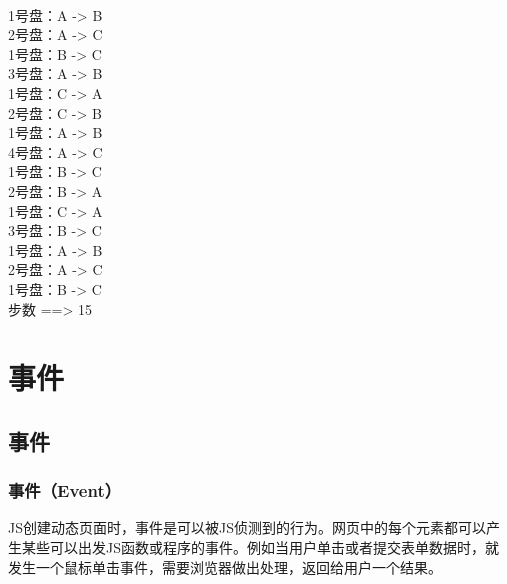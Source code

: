 \begin{tcolorbox}
	 \\
	1号盘：A -> B \\
	2号盘：A -> C \\
	1号盘：B -> C \\
	3号盘：A -> B \\
	1号盘：C -> A \\
	2号盘：C -> B \\
	1号盘：A -> B \\
	4号盘：A -> C \\
	1号盘：B -> C \\
	2号盘：B -> A \\
	1号盘：C -> A \\
	3号盘：B -> C \\
	1号盘：A -> B \\
	2号盘：A -> C \\
	1号盘：B -> C \\
	步数 ==> 15
\end{tcolorbox}

\newpage

\chapter{事件}

\section{事件}

\subsection{事件（Event）}

JS创建动态页面时，事件是可以被JS侦测到的行为。网页中的每个元素都可以产生某些可以出发JS函数或程序的事件。例如当用户单击或者提交表单数据时，就发生一个鼠标单击事件，需要浏览器做出处理，返回给用户一个结果。

\begin{table}[H]
	\centering
\end{table}

